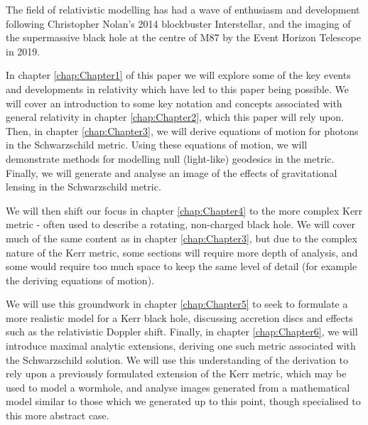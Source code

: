 \documentclass[oneside,openright,frontopenright, singlespacing]{dmathesis}
\begin{document}
\begin{introduction}

	The field of relativistic modelling has had a wave of enthusiasm and development following Christopher Nolan’s 2014 blockbuster Interstellar\cite{Interstellar}, and the imaging of the supermassive black hole at the centre of M87 by the Event Horizon Telescope in 2019\cite{event2019first}.

\vspace{1em}
	 In chapter \ref{chap:Chapter1} of this paper we will explore some of the key events and developments in relativity which have led to this paper being possible. We will cover an introduction to some key notation and concepts associated with general relativity in chapter \ref{chap:Chapter2}, which this paper will rely upon. Then, in chapter \ref{chap:Chapter3}, we will derive equations of motion for photons in the Schwarzschild metric. Using these equations of motion, we will demonstrate methods for modelling null (light-like) geodesics in the metric. Finally, we will generate and analyse an image of the effects of gravitational lensing in the Schwarzschild metric.

\vspace{1em}
	We will then shift our focus in chapter \ref{chap:Chapter4} to the more complex Kerr metric - often used to describe a rotating, non-charged black hole. We will cover much of the same content as in chapter \ref{chap:Chapter3}, but due to the complex nature of the Kerr metric, some sections will require more depth of analysis, and some would require too much space to keep the same level of detail (for example the deriving equations of motion).

\vspace{1em}
	We will use this groundwork in chapter \ref{chap:Chapter5} to seek to formulate a more realistic model for a Kerr black hole, discussing accretion discs and effects such as the relativistic Doppler shift. Finally, in chapter \ref{chap:Chapter6}, we will introduce maximal analytic extensions, deriving one such metric associated with the Schwarzschild solution. We will use this understanding of the derivation to rely upon a previously formulated extension of the Kerr metric, which may be used to model a wormhole, and analyse images generated from a mathematical model similar to those which we generated up to this point, though specialised to this more abstract case. 

\vspace{1em}
	

\end{introduction}
\end{document}
